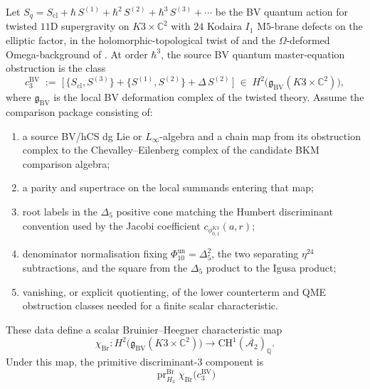 \begin{theorem}
\label{thm:bvbrst-3loop-obstruction}
Let $S_q = S_{\mathrm{cl}} + \hbar\,S^{(1)} + \hbar^2\,S^{(2)} + \hbar^3\,S^{(3)} + \cdots$
be the BV quantum action for twisted $11$D supergravity on
$K3\times\mathbb{C}^2$ with $24$ Kodaira $I_1$ M$5$-brane defects on
the elliptic factor, in the holomorphic-topological twist of
\cite{Costello2017M5,CL16} and the
$\Omega$-deformed Omega-background of
\cite{Costello2015omega,Nekrasov:2003rj}. At order $\hbar^3$, the
source BV quantum master-equation obstruction is the class
\[
 c_3^{\mathrm{BV}}
 \;:=\;
 \bigl[\,\{S_{\mathrm{cl}},S^{(3)}\} +
 \{S^{(1)},S^{(2)}\} +
 \Delta\,S^{(2)}\,\bigr]
 \;\in\;
 H^2\bigl(\mathfrak{g}_{\mathrm{BV}}(K3\times\mathbb{C}^2)\bigr),
\]
where \(\mathfrak{g}_{\mathrm{BV}}\) is the local BV deformation
complex of the twisted theory. Assume the comparison package consisting
of:
\begin{enumerate}[leftmargin=1.8em,label=\textup{(\roman*)}]
\item a source BV/hCS dg Lie or \(L_\infty\)-algebra and a chain map
from its obstruction complex to the Chevalley--Eilenberg complex of the
candidate BKM comparison algebra;
\item a parity and supertrace on the local summands entering that map;
\item root labels in the \(\Delta_5\) positive cone matching the
Humbert discriminant convention used by the Jacobi coefficient
\(c_{\phi_{0,1}^{K3}}(a,r)\);
\item denominator normalisation fixing
\(\Phi_{10}^{\mathrm{un}}=\Delta_5^2\), the two separating \(\eta^{24}\) subtractions,
and the square from the \(\Delta_5\) product to the Igusa product;
\item vanishing, or explicit quotienting, of the lower counterterm and
QME obstruction classes needed for a finite scalar characteristic.
\end{enumerate}
These data define a scalar Bruinier--Heegner characteristic map
\[
 \chi_{\mathrm{Br}}\colon
 H^2\bigl(\mathfrak{g}_{\mathrm{BV}}(K3\times\mathbb{C}^2)\bigr)
 \longrightarrow
 \mathrm{CH}^1(\overline{\mathcal{A}_2})_\mathbb{Q}.
\]
Under this map, the primitive discriminant-\(3\) component is
\begin{equation}\label{eq:bv-3loop-obstruction-class}
 \operatorname{pr}_{H_3}^{\mathrm{Br}}
 \chi_{\mathrm{Br}}\bigl(c_3^{\mathrm{BV}}\bigr)

\end{equation}
\end{theorem}
